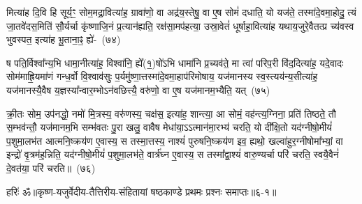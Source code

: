 मित्या॑ह दि॒वि हि सूर्य॒ꣳ॒ सोम॒मद्रा॒वित्या॑ह॒ ग्रावा॑णो॒ वा अद्र॑य॒स्तेषु॒ वा ए॒ष सोमं॑ दधाति॒ यो यज॑ते॒ तस्मा॑दे॒वमा॒होदु॒ त्यं जा॒तवे॑दस॒मिति॑ सौ॒र्यर्चा कृ॑ष्णाजि॒नं प्र॒त्यान॑ह्यति॒ रक्ष॑सा॒मप॑हत्या॒ उस्रा॒वेतं॑ धूर्\mbox{}षाहा॒वित्या॑ह यथाय॒जुरे॒वैतत्प्र च्य॑वस्व भुवस्पत॒ इत्या॑ह भू॒ताना॒ꣴ॒ ह्ये॑-~(७४)\ip

ष पति॒र्विश्वा᳚न्य॒भि धामा॒नीत्या॑ह॒ विश्वा॑नि॒ ह्ये᳚(१॒)षो॑\-ऽभि धामा॑नि प्र॒च्यव॑ते॒ मा त्वा॑ परिप॒री वि॑द॒दित्या॑ह॒ यदे॒वादः सोम॑माह्रि॒यमा॑णं गन्ध॒र्वो वि॒श्वाव॑सुः प॒र्यमु॑ष्णा॒त्तस्मा॑दे॒वमा॒हाप॑रिमोषाय॒ यज॑मानस्य स्व॒स्त्यय॑न्य॒सीत्या॑ह॒ यज॑मानस्यै॒वैष य॒ज्ञस्या᳚न्वार॒म्भो\-ऽन॑वछित्त्यै॒ वरु॑णो॒ वा ए॒ष यज॑मानम॒भ्यैति॒ यत्~(७५)\ip

क्री॒तः सोम॒ उप॑नद्धो॒ नमो॑ मि॒त्रस्य॒ वरु॑णस्य॒ चक्ष॑स॒ इत्या॑ह॒ शान्त्या॒ आ सोमं॒ वह॑न्त्य॒ग्निना॒ प्रति॑ तिष्ठते॒ तौ स॒म्भव॑न्तौ॒ यज॑मानम॒भि सम्भ॑वतः पु॒रा खलु॒ वावैष मेधा॑या॒\-ऽऽत्मान॑मा॒रभ्य॑ चरति॒ यो दी᳚क्षि॒तो यद॑ग्नीषो॒मीयं॑ प॒शुमा॒लभ॑त आत्मनि॒ष्क्रय॑ण ए॒वास्य॒ स तस्मा॒त्तस्य॒ नाश्यं॑ पुरुषनि॒ष्क्रय॑ण इव॒ ह्यथो॒ खल्वा॑हुर॒ग्नी\-षोमा᳚भ्यां॒ वा इन्द्रो॑ वृ॒त्रम॑ह॒न्निति॒ यद॑ग्नीषो॒मीयं॑ प॒शुमा॒लभ॑ते॒ वार्त्र॑घ्न ए॒वास्य॒ स तस्मा᳚द्\-वा॒श्यं॑ वारु॒ण्यर्चा परि॑ चरति॒ स्वयै॒वैनं॑ दे॒वत॑या॒ परि॑ चरति॥~(७६)\ip

{\anuvakamend[{अ॒न्वा॒रभ्योथ्सर्वा॑भिरे॒व सूर्यं॑ भू॒ताना॒ꣴ॒ ह्ये॑ति॒ यदा॑हुः स॒प्तविꣳ॑शतिश्च}]}%

{हरिः॑ ॐ}{॥कृष्ण-यजुर्वेदीय-तैत्तिरीय-संहितायां षष्ठकाण्डे प्रथमः प्रश्नः समाप्तः॥६-१॥}


